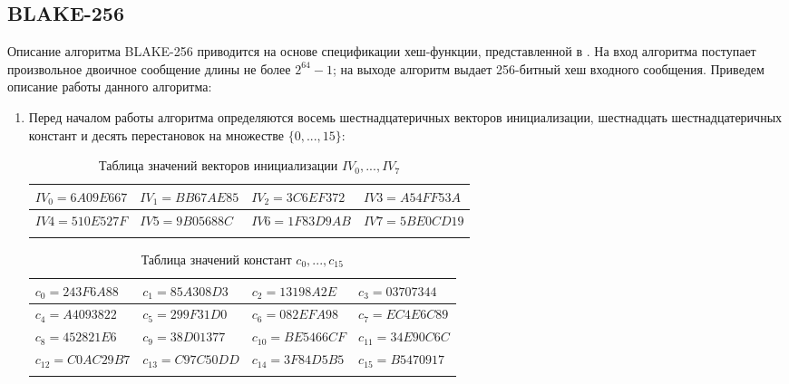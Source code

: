 \documentclass{./civarticle}
\begin{document}
\subsection{BLAKE-256}

Описание алгоритма BLAKE-256 приводится на основе спецификации хеш-функции, представленной в \cite{blake}. На вход алгоритма поступает произвольное двоичное сообщение длины не более $2^{64} - 1$; на выходе алгоритм выдает 256-битный хеш входного сообщения. Приведем описание работы данного алгоритма: 

\begin{enumerate}
    \item Перед началом работы алгоритма определяются восемь шестнадцатеричных векторов инициализации, шестнадцать шестнадцатеричных констант и десять перестановок на множестве $\{ 0, ..., 15 \}$:

    \begin{longtable}{|p{2.6cm}|p{2.6cm}|p{2.6cm}|p{2.6cm}|}
\hline
$IV_0 = 6A09E667$ & $IV_1 = BB67AE85$ & $IV_2 = 3C6EF372$ & $IV3 = A54FF53A$ \\
\hline
$IV4 = 510E527F$ & $IV5 = 9B05688C$ & $IV6 = 1F83D9AB$ & $IV7 = 5BE0CD19$ \\
\hline
\caption{Таблица значений векторов инициализации $IV_0, ..., IV_{7}$}
\end{longtable}

\begin{longtable}{|p{2.6cm}|p{2.6cm}|p{2.6cm}|p{2.6cm}|}
\hline
$c_0 = 243F6A88$ & $c_1 = 85A308D3$ & $c_2 = 13198A2E$ & $c_3 = 03707344$ \\
\hline
$c_4 = A4093822$ & $c_5 = 299F31D0$ & $c_6 = 082EFA98$ & $c_7 = EC4E6C89$ \\
\hline
$c_8 = 452821E6$ & $c_9 = 38D01377$ & $c_{10} = BE5466CF$ & $c_{11} = 34E90C6C$ \\
\hline
$c_{12} = C0AC29B7$ & $c_{13} = C97C50DD$ & $c_{14} = 3F84D5B5$ & $c_{15} = B5470917$ \\
\hline
\caption{Таблица значений констант $c_0, ..., c_{15}$}
\end{longtable}


\end{enumerate}
\end{document}
